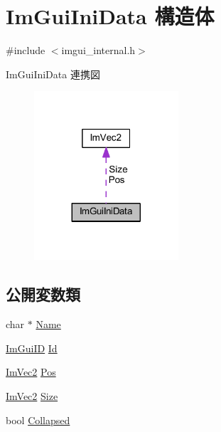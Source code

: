 \hypertarget{struct_im_gui_ini_data}{}\section{Im\+Gui\+Ini\+Data 構造体}
\label{struct_im_gui_ini_data}


{\ttfamily \#include $<$imgui\+\_\+internal.\+h$>$}



Im\+Gui\+Ini\+Data 連携図\nopagebreak
\begin{figure}[H]
\begin{center}
\leavevmode
\includegraphics[width=152pt]{struct_im_gui_ini_data__coll__graph}
\end{center}
\end{figure}
\subsection*{公開変数類}
\begin{DoxyCompactItemize}
\item 
char $\ast$ \mbox{\hyperlink{struct_im_gui_ini_data_aef4db96cc7332d492bba873028a00f66}{Name}}
\item 
\mbox{\hyperlink{imgui_8h_a1785c9b6f4e16406764a85f32582236f}{Im\+Gui\+ID}} \mbox{\hyperlink{struct_im_gui_ini_data_a8c3cd42549a5f432199d1a66e0133d80}{Id}}
\item 
\mbox{\hyperlink{struct_im_vec2}{Im\+Vec2}} \mbox{\hyperlink{struct_im_gui_ini_data_a8598c0d937901fc22f808f11f9aa6bac}{Pos}}
\item 
\mbox{\hyperlink{struct_im_vec2}{Im\+Vec2}} \mbox{\hyperlink{struct_im_gui_ini_data_af3d56b3e89c45d07d7927ab95dbd86fa}{Size}}
\item 
bool \mbox{\hyperlink{struct_im_gui_ini_data_a299660ea0cab78a8cbefa02314c8cf47}{Collapsed}}
\end{DoxyCompactItemize}


